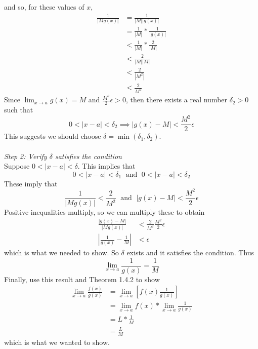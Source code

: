 \documentclass{article}
\begin{document}
	and so, for these values of $x$,
	\begin{align*}
		\frac{1}{|Mg(x)|} &= \frac{1}{|M||g(x)|} \\
		                  &= \frac{1}{|M|} * \frac{1}{|g(x)|} \\
		                  &< \frac{1}{|M|} * \frac{2}{|M|} \\
		                  &< \frac{2}{|M||M|} \\
		                  &< \frac{2}{|M^2|} \\
		                  &< \frac{2}{M^2} \tag{$M^2 > 0$}
	\end{align*}
	Since $\lim_{x \to a}{g(x)} = M$ and $\frac{M^2}{2}\epsilon > 0$, then there exists a real number $\delta_{2} > 0$ such that
$$0 < |x - a| < \delta_{2} \implies |g(x) - M| < \frac{M^2}{2}\epsilon$$
This suggests we should choose $\delta = \min{(\delta_{1}, \delta_{2})}$. \\\\
\textit{Step 2: Verify $\delta$ satisfies the condition} \\
Suppose $0 < |x - a| < \delta$. This implies that
$$0 < |x - a| < \delta_{1} \; \text{ and } \; 0 < |x - a| < \delta_{2}$$
These imply that
$$\frac{1}{|Mg(x)|} < \frac{2}{M^2} \; \text{ and } \; |g(x) - M| < \frac{M^2}{2}\epsilon$$
Positive inequalities multiply, so we can multiply these to obtain
\begin{align*}
	\frac{|g(x) - M|}{|Mg(x)|} &< \frac{2}{M^2}\frac{M^2}{2}\epsilon \\
	\left|\frac{1}{g(x)} - \frac{1}{M}\right| &< \epsilon
\end{align*}
which is what we needed to show. So $\delta$ exists and it satisfies the condition. Thus
$$\lim_{x \to a}{\frac{1}{g(x)}} = \frac{1}{M}$$
Finally, use this result and Theorem 1.4.2 to show
\begin{align*}
	\lim_{x \to a}{\frac{f(x)}{g(x)}} &= \lim_{x \to a}{\left[f(x)\frac{1}{g(x)}\right]} \\
	                                  &= \lim_{x \to a}{f(x)} * \lim_{x \to a}{\frac{1}{g(x)}} \\
	                                  &= L * \frac{1}{M} \\
	                                  &= \frac{L}{M}
\end{align*}
which is what we wanted to show.
\end{document}
